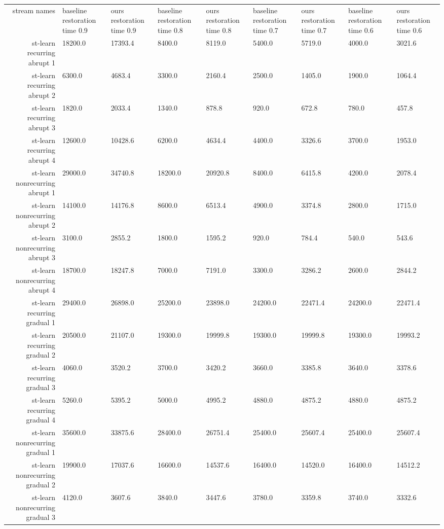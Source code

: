 \begin{tabular}{|r|l|l|l|l|l|l|l|l|}
  \hline
  stream names & baseline restoration time 0.9 & ours restoration time 0.9 & baseline restoration time 0.8 & ours restoration time 0.8 & baseline restoration time 0.7 & ours restoration time 0.7 & baseline restoration time 0.6 & ours restoration time 0.6 \\ 
  st-learn recurring abrupt 1 & 18200.0 & 17393.4 & 8400.0 & 8119.0 & 5400.0 & 5719.0 & 4000.0 & 3021.6 \\ 
  st-learn recurring abrupt 2 & 6300.0 & 4683.4 & 3300.0 & 2160.4 & 2500.0 & 1405.0 & 1900.0 & 1064.4 \\ 
  st-learn recurring abrupt 3 & 1820.0 & 2033.4 & 1340.0 & 878.8 & 920.0 & 672.8 & 780.0 & 457.8 \\ 
  st-learn recurring abrupt 4 & 12600.0 & 10428.6 & 6200.0 & 4634.4 & 4400.0 & 3326.6 & 3700.0 & 1953.0 \\ 
  st-learn nonrecurring abrupt 1 & 29000.0 & 34740.8 & 18200.0 & 20920.8 & 8400.0 & 6415.8 & 4200.0 & 2078.4 \\ 
  st-learn nonrecurring abrupt 2 & 14100.0 & 14176.8 & 8600.0 & 6513.4 & 4900.0 & 3374.8 & 2800.0 & 1715.0 \\ 
  st-learn nonrecurring abrupt 3 & 3100.0 & 2855.2 & 1800.0 & 1595.2 & 920.0 & 784.4 & 540.0 & 543.6 \\ 
  st-learn nonrecurring abrupt 4 & 18700.0 & 18247.8 & 7000.0 & 7191.0 & 3300.0 & 3286.2 & 2600.0 & 2844.2 \\ 
  st-learn recurring gradual 1 & 29400.0 & 26898.0 & 25200.0 & 23898.0 & 24200.0 & 22471.4 & 24200.0 & 22471.4 \\ 
  st-learn recurring gradual 2 & 20500.0 & 21107.0 & 19300.0 & 19999.8 & 19300.0 & 19999.8 & 19300.0 & 19993.2 \\ 
  st-learn recurring gradual 3 & 4060.0 & 3520.2 & 3700.0 & 3420.2 & 3660.0 & 3385.8 & 3640.0 & 3378.6 \\ 
  st-learn recurring gradual 4 & 5260.0 & 5395.2 & 5000.0 & 4995.2 & 4880.0 & 4875.2 & 4880.0 & 4875.2 \\ 
  st-learn nonrecurring gradual 1 & 35600.0 & 33875.6 & 28400.0 & 26751.4 & 25400.0 & 25607.4 & 25400.0 & 25607.4 \\ 
  st-learn nonrecurring gradual 2 & 19900.0 & 17037.6 & 16600.0 & 14537.6 & 16400.0 & 14520.0 & 16400.0 & 14512.2 \\ 
  st-learn nonrecurring gradual 3 & 4120.0 & 3607.6 & 3840.0 & 3447.6 & 3780.0 & 3359.8 & 3740.0 & 3332.6 \\ 

\end{tabular}
